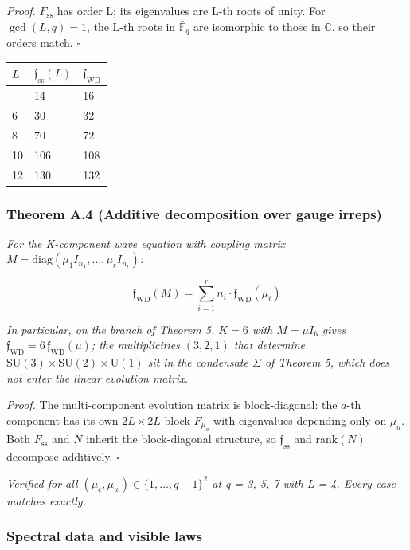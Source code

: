 \documentclass[
]{article}
\begin{document}
\emph{Proof.} \(F_{\mathrm{ss}}\) has order L; its eigenvalues are L-th
roots of unity. For \(\gcd(L, q) = 1\), the L-th roots in
\(\bar{\mathbb{F}}_q\) are isomorphic to those in \(\mathbb{C}\), so
their orders match. \(\square\)

\begin{longtable}[]{@{}lll@{}}
\toprule\noalign{}
\(L\) & \(\mathfrak{f}_{\mathrm{ss}}(L)\) &
\(\mathfrak{f}_{\mathrm{WD}}\) \\
\midrule\noalign{}
\endhead
\bottomrule\noalign{}
\endlastfoot
4 & 14 & 16 \\
6 & 30 & 32 \\
8 & 70 & 72 \\
10 & 106 & 108 \\
12 & 130 & 132 \\
\end{longtable}

\hypertarget{theorem-a.4-additive-decomposition-over-gauge-irreps}{%
\subsubsection{Theorem A.4 (Additive decomposition over gauge
irreps)}\label{theorem-a.4-additive-decomposition-over-gauge-irreps}}

\emph{For the K-component wave equation with coupling matrix
\(M = \mathrm{diag}(\mu_1 I_{n_1}, \ldots, \mu_r I_{n_r})\):}

\[\mathfrak{f}_{\mathrm{WD}}(M) = \sum_{i=1}^{r} n_i \cdot \mathfrak{f}_{\mathrm{WD}}(\mu_i)\]

\emph{In particular, on the branch of Theorem 5, \(K = 6\) with
\(M = \mu I_6\) gives
\(\mathfrak{f}_{\mathrm{WD}} = 6\,\mathfrak{f}_{\mathrm{WD}}(\mu)\); the
multiplicities \((3, 2, 1)\) that determine
\(\mathrm{SU}(3) \times \mathrm{SU}(2) \times \mathrm{U}(1)\) sit in the
condensate \(\Sigma\) of Theorem 5, which does not enter the linear
evolution matrix.}

\emph{Proof.} The multi-component evolution matrix is block-diagonal:
the \(a\)-th component has its own \(2L \times 2L\) block \(F_{\mu_a}\)
with eigenvalues depending only on \(\mu_a\). Both \(F_{\mathrm{ss}}\)
and \(N\) inherit the block-diagonal structure, so
\(\mathfrak{f}_{\mathrm{ss}}\) and rank\((N)\) decompose additively.
\(\square\)

\emph{Verified for all \((\mu_c, \mu_w) \in \{1, \ldots, q-1\}^2\) at q
= 3, 5, 7 with L = 4. Every case matches exactly.}

\hypertarget{spectral-data-and-visible-laws}{%
\subsubsection{Spectral data and visible
laws}\label{spectral-data-and-visible-laws}}
\end{document}
